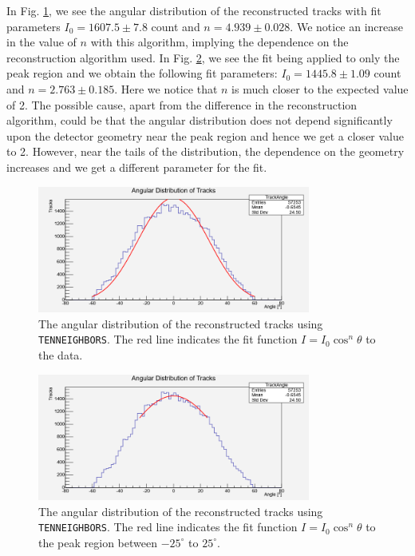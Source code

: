 \documentclass[a4paper]{report}
\numberwithin{equation}{section}
\begin{document}
In Fig. \ref{fig:tentrack_fit}, we see the angular distribution of the reconstructed tracks with fit parameters 
$I_0 = 1607.5 \pm 7.8$ count and $n = 4.939 \pm 0.028$. We notice an increase in the value of $n$ with this algorithm,
 implying the dependence on the reconstruction algorithm used. In Fig. \ref{fig:tentrack_peak}, we see the fit being 
 applied to only the peak region and we obtain the following fit parameters: $I_0 = 1445.8 \pm 1.09$ count and 
 $n = 2.763 \pm 0.185$. Here we notice that $n$ is much closer to the expected value of 2. The possible cause, apart from
  the difference in the reconstruction algorithm, could be that the angular distribution does not depend significantly
   upon the detector geometry near the peak region and hence we get a closer value to 2. However, near the tails of 
   the distribution, the dependence on the geometry increases and we get a different parameter for the fit. 

\begin{figure}[htb!]
	\centering
	\includegraphics[width=0.8\textwidth]{tentrack_fit.png}
	\caption{The angular distribution of the reconstructed tracks using \texttt{TENNEIGHBORS}. The red line indicates the fit function $I = I_0 \cos^n \theta$
			to the data.}
	\label{fig:tentrack_fit}
\end{figure}

\begin{figure}[htb!]
	\centering
	\includegraphics[width=0.8\textwidth]{tentrack_peak.png}
	\caption{The angular distribution of the reconstructed tracks using \texttt{TENNEIGHBORS}. The red line indicates the fit function $I = I_0 \cos^n \theta$
			to the peak region between $-25^{\circ}$ to $25^{\circ}$.}
	\label{fig:tentrack_peak}
\end{figure}
\end{document}
